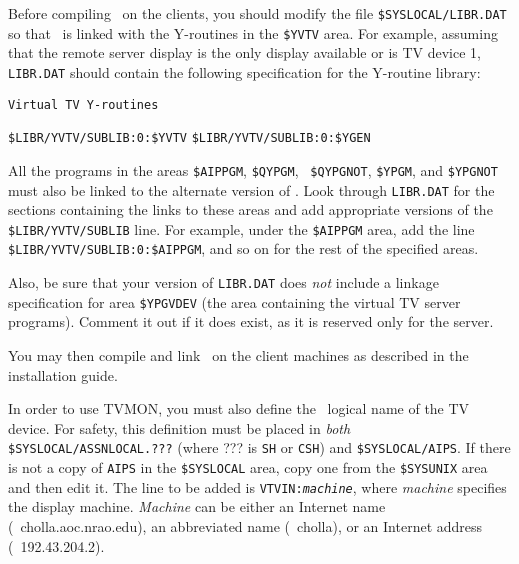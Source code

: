 
Before compiling \AIPS\ on the clients, you should modify the file
{\tt \$SYSLOCAL/LIBR.DAT} so that \AIPS\ is linked with the Y-routines
in the {\tt \$YVTV} area.  For example, assuming that the remote server
display is the only display available or is TV device 1, {\tt LIBR.DAT}
should contain the following specification for the Y-routine library:

\noindent
{\tt Virtual TV Y-routines}

\noindent
{\tt \$LIBR/YVTV/SUBLIB:0:\$YVTV}\hfill\break
{\tt \$LIBR/YVTV/SUBLIB:0:\$YGEN}


All the programs in the areas {\tt \$AIPPGM}, {\tt \$QYPGM}, {\tt
\$QYPGNOT}, {\tt \$YPGM}, and {\tt \$YPGNOT} must also be linked to
the alternate version of \hbox{\AIPS}.  Look through {\tt LIBR.DAT}
for the sections containing the links to these areas and add
appropriate versions of the {\tt \$LIBR/YVTV/SUBLIB} line.  For
example, under the {\tt \$AIPPGM} area, add the line {\tt
\$LIBR/YVTV/SUBLIB:0:\$AIPPGM\/}, and so on for the rest of the
specified areas.

Also, be sure that your version of {\tt LIBR.DAT} does {\it not} include a
linkage specification for area {\tt \$YPGVDEV} (the area containing the
virtual TV server programs).  Comment it out if it does exist, as it is
reserved only for the server.

You may then compile and link \AIPS\ on the client machines as described
in the installation guide.

In order to use TVMON, you must also define the \AIPS\ logical name of
the TV device.  For safety, this definition must be placed in {\it both}
{\tt \$SYSLOCAL/ASSNLOCAL.???} (where ??? is {\tt SH} or {\tt CSH}) and
\hbox{{\tt \$SYSLOCAL/AIPS}}.  If there is not a copy of {\tt AIPS} in the
{\tt \$SYSLOCAL} area, copy one from the {\tt \$SYSUNIX} area and then edit
it.  The line to be added is {\tt VTVIN:{\it machine\/}}, where
{\it machine\/} specifies the display machine.  {\it Machine\/} can be
either an Internet name (\eg\ cholla.aoc.nrao.edu), an abbreviated name
(\eg\ cholla), or an Internet address (\eg\ 192.43.204.2).

